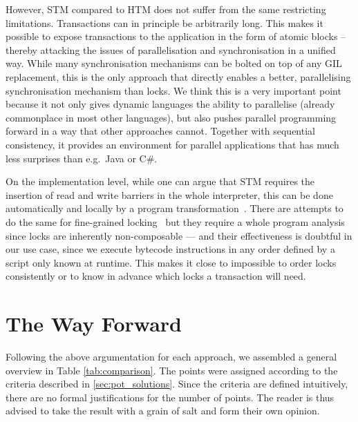 \documentclass{sigplanconf}
\begin{document}
However, STM compared to HTM does not suffer from the same restricting
limitations. Transactions can in principle be arbitrarily long.  This makes it
possible to expose transactions to the application in the
form of atomic blocks -- thereby attacking the issues
of parallelisation and synchronisation in a unified way. While many
synchronisation mechanisms can be bolted on top of any GIL replacement,
this is the only approach that directly enables a better, parallelising
synchronisation mechanism than locks.  We think this is a very
important point because it not only gives dynamic languages the
ability to parallelise (already commonplace in most other languages),
but also pushes parallel programming forward in a way that other
approaches cannot. Together with sequential consistency, it provides an
environment for parallel applications that has much less surprises than
e.g.\ Java or C\#.

On the implementation level,
while one can argue that STM requires the insertion of read and write
barriers in the whole interpreter, this can be done automatically and
locally by a program transformation~\cite{felber07}. There are attempts
to do the same for fine-grained locking~\cite{bill06} but they require
a whole program analysis since locks are inherently non-composable
--- and their effectiveness is doubtful in our use case,
since we execute bytecode instructions in any order defined by a
script only known at runtime. This makes it close to impossible to
order locks consistently or to know in advance which locks a
transaction will need.




\section{The Way Forward}


Following the above argumentation for each approach, we assembled a
general overview in Table \ref{tab:comparison}. The points were assigned
according to the criteria described in \ref{sec:pot_solutions}. Since
the criteria are defined intuitively, there are no formal justifications
for the number of points. The reader is thus advised to take the result
with a grain of salt and form their own opinion.
\end{document}

